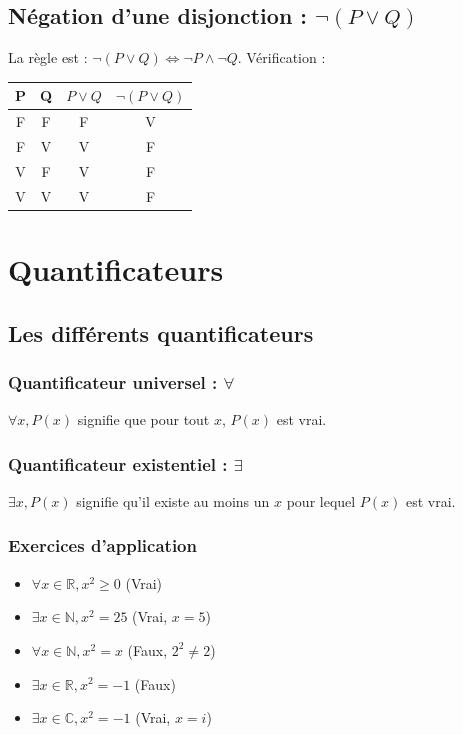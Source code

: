 \documentclass[a4paper,12pt]{article}
\begin{document}
\subsection{Négation d'une disjonction : $\neg (P \vee Q)$}
La règle est : $\neg (P \vee Q) \iff \neg P \wedge \neg Q$. Vérification :
\begin{center}
\begin{tabular}{|c|c|c|c|}
\hline
P & Q & $P \vee Q$ & $\neg (P \vee Q)$ \\
\hline
F & F & F & V \\
F & V & V & F \\ 
V & F & V & F \\
V & V & V & F \\
\hline
\end{tabular}
\end{center}

\newpage
\section{Quantificateurs}
\subsection{Les différents quantificateurs}

\subsubsection{Quantificateur universel : $\forall$}
$ \forall x, P(x) $ signifie que pour tout $x$, $P(x)$ est vrai.

\subsubsection{Quantificateur existentiel : $\exists$}
$ \exists x, P(x) $ signifie qu'il existe au moins un $x$ pour lequel $P(x)$ est vrai.

\subsubsection{Exercices d'application}
\begin{itemize}
    \item $ \forall x \in \mathbb{R}, x^2 \geq 0 $ (Vrai)
    \item $ \exists x \in \mathbb{N}, x^2 = 25 $ (Vrai, $x=5$)
    \item $ \forall x \in \mathbb{N}, x^2 = x $ (Faux, $2^2 \neq 2$)
    \item $ \exists x \in \mathbb{R}, x^2 = -1 $ (Faux)
    \item $ \exists x \in \mathbb{C}, x^2 = -1 $ (Vrai, $x=i$)
\end{itemize}
\end{document}
